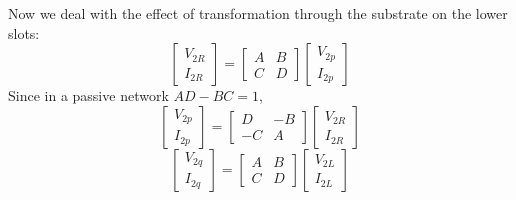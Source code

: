 \documentclass{article}
\begin{document}
Now we deal with the effect of transformation through the substrate on the lower slots:
\begin{equation}
\begin{bmatrix}V_{2R}\\I_{2R}\end{bmatrix} = \begin{bmatrix}A & B\\C&D\end{bmatrix}\begin{bmatrix}V_{2p}\\I_{2p}\end{bmatrix}
\end{equation}
Since in a passive network $AD-BC=1$,
\begin{equation}
\begin{bmatrix}V_{2p}\\I_{2p}\end{bmatrix} = \begin{bmatrix}D& -B\\-C&A\end{bmatrix}\begin{bmatrix}V_{2R}\\I_{2R}\end{bmatrix}
\end{equation}
\begin{equation}
\begin{bmatrix}V_{2q}\\I_{2q}\end{bmatrix} = \begin{bmatrix}A & B\\C&D\end{bmatrix}\begin{bmatrix}V_{2L}\\I_{2L}\end{bmatrix}
\end{equation}
\end{document}

